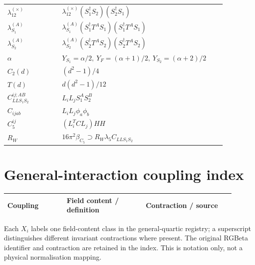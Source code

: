 \documentclass[10pt,a4paper]{article}
\begin{document}
\begin{longtable}{@{}p{0.23\linewidth}p{0.69\linewidth}@{}}
$\lambda_{12}^{(\times)}$ & $\lambda_{12}^{(\times)}(S_1^\dagger S_2)(S_2^\dagger S_1)$ \\
$\lambda_{S_1}^{(A)}$ & $\lambda_{S_1}^{(A)}(S_1^\dagger T^A S_1)(S_1^\dagger T^A S_1)$ \\
$\lambda_{S_2}^{(A)}$ & $\lambda_{S_2}^{(A)}(S_2^\dagger T^A S_2)(S_2^\dagger T^A S_2)$ \\
$\alpha$ & $Y_{S_1}=\alpha/2,\ Y_F=(\alpha+1)/2,\ Y_{S_2}=(\alpha+2)/2$ \\
$C_2(d)$ & $(d^2-1)/4$ \\
$T(d)$ & $d(d^2-1)/12$ \\
$C_{LLS_1S_2}^{ij;AB}$ & $L_iL_jS_1^AS_2^B$ \\
$C_{ijab}$ & $L_iL_j\phi_a\phi_b$ \\
$C_5^{ij}$ & $(L_i^TCL_j)HH$ \\
$R_W$ & $16\pi^2\beta_{C_5}\supset R_W\lambda_5C_{LLS_1S_2}$ \\
\bottomrule
\end{longtable}
\section*{General-interaction coupling index}
\small
\begin{longtable}{@{}p{0.24\linewidth}p{0.32\linewidth}p{0.36\linewidth}@{}}
\toprule
Coupling & Field content / definition & Contraction / source \\
\midrule
\bottomrule
\end{longtable}
\normalsize
Each $X_i$ labels one field-content class in the general-quartic registry; a superscript distinguishes different invariant contractions where present. The original RGBeta identifier and contraction are retained in the index. This is notation only, not a physical normalisation mapping.
\clearpage
\end{document}
